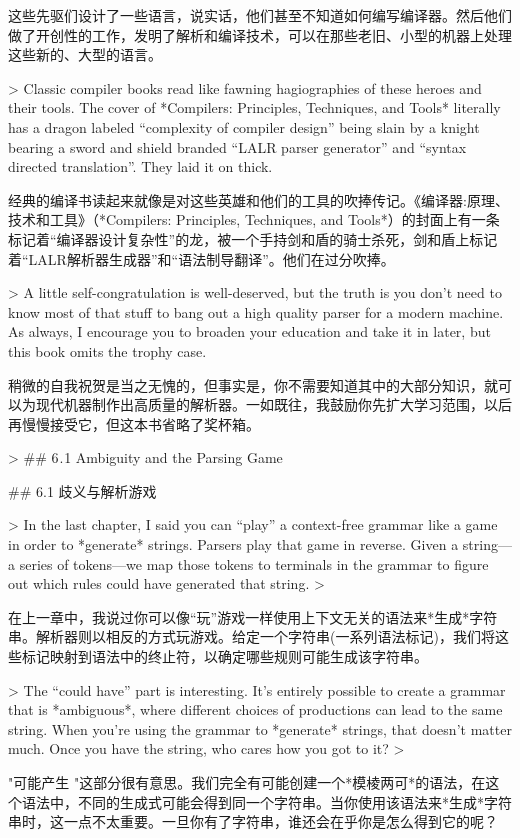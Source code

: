 \documentclass[cn,11pt,chinese]{elegantbook}
\begin{document}
这些先驱们设计了一些语言，说实话，他们甚至不知道如何编写编译器。然后他们做了开创性的工作，发明了解析和编译技术，可以在那些老旧、小型的机器上处理这些新的、大型的语言。

> Classic compiler books read like fawning hagiographies of these heroes and their tools. The cover of *Compilers: Principles, Techniques, and Tools* literally has a dragon labeled “complexity of compiler design” being slain by a knight bearing a sword and shield branded “LALR parser generator” and “syntax directed translation”. They laid it on thick.

经典的编译书读起来就像是对这些英雄和他们的工具的吹捧传记。《编译器:原理、技术和工具》（*Compilers: Principles, Techniques, and Tools*）的封面上有一条标记着“编译器设计复杂性”的龙，被一个手持剑和盾的骑士杀死，剑和盾上标记着“LALR解析器生成器”和“语法制导翻译”。他们在过分吹捧。

> A little self-congratulation is well-deserved, but the truth is you don’t need to know most of that stuff to bang out a high quality parser for a modern machine. As always, I encourage you to broaden your education and take it in later, but this book omits the trophy case.

稍微的自我祝贺是当之无愧的，但事实是，你不需要知道其中的大部分知识，就可以为现代机器制作出高质量的解析器。一如既往，我鼓励你先扩大学习范围，以后再慢慢接受它，但这本书省略了奖杯箱。

> ## 6 . 1 Ambiguity and the Parsing Game

## 6.1 歧义与解析游戏

> In the last chapter, I said you can “play” a context-free grammar like a game in order to *generate* strings. Parsers play that game in reverse. Given a string—a series of tokens—we map those tokens to terminals in the grammar to figure out which rules could have generated that string.
>

在上一章中，我说过你可以像“玩”游戏一样使用上下文无关的语法来*生成*字符串。解析器则以相反的方式玩游戏。给定一个字符串(一系列语法标记)，我们将这些标记映射到语法中的终止符，以确定哪些规则可能生成该字符串。

> The “could have” part is interesting. It’s entirely possible to create a grammar that is *ambiguous*, where different choices of productions can lead to the same string. When you’re using the grammar to *generate* strings, that doesn’t matter much. Once you have the string, who cares how you got to it?
>

"可能产生 "这部分很有意思。我们完全有可能创建一个*模棱两可*的语法，在这个语法中，不同的生成式可能会得到同一个字符串。当你使用该语法来*生成*字符串时，这一点不太重要。一旦你有了字符串，谁还会在乎你是怎么得到它的呢？
\end{document}
